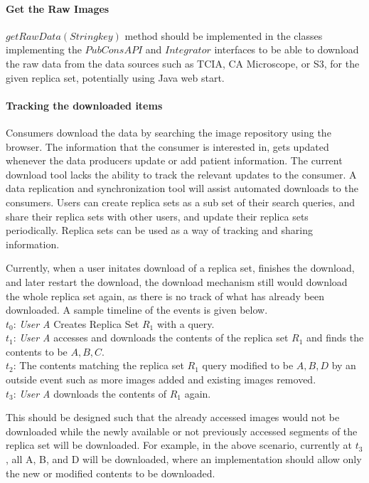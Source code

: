 \documentclass[conference]{IEEEtran}
\begin{document}
\paragraph*{Get the Raw Images}
$getRawData(String key)$ method should be implemented in the classes implementing the $PubConsAPI$ and $Integrator$ interfaces to be able to download the raw data from the data sources such as TCIA, CA Microscope, or S3, for the given replica set, potentially using Java web start.

\paragraph*{Tracking the downloaded items}
Consumers download the data by searching the image repository using the browser. The information that the consumer is interested in, gets updated whenever the data producers update or add patient information. The current download tool lacks the ability to track the relevant updates to the consumer. A data replication and synchronization tool will assist automated downloads to the consumers. Users can create replica sets as a sub set of their search queries, and share their replica sets with other users, and update their replica sets periodically. Replica sets can be used as a way of tracking and sharing information.

Currently, when a user initates download of a replica set, finishes the download, and later restart the download, the download mechanism still would download the whole replica set again, as there is no track of what has already been downloaded. A sample timeline of the events is given below.\\
 $t_{0}$: \textit{User A} Creates Replica Set $R_{1}$ with a query.\\
 $t_{1}$: \textit{User A} accesses and downloads the contents of the replica set $R_{1}$ and finds the contents to be ${A,B,C}$.\\
 $t_{2}$: The contents matching the replica set $R_{1}$ query modified to be ${A,B,D}$ by an outside event such as more images added and existing images removed.\\
 $t_{3}$: \textit{User A} downloads the contents of $R_{1}$ again.

This should be designed such that the already accessed images would not be downloaded while the newly available or not previously accessed segments of the replica set will be downloaded. For example, in the above scenario, currently at $t_{3}$, all A, B, and D will be downloaded, where an implementation should allow only the new or modified contents to be downloaded.
\end{document}
